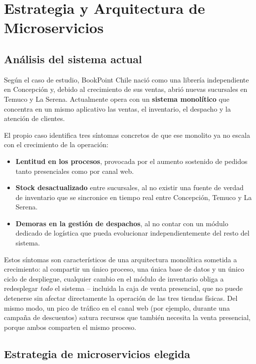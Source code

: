 \chapter{Estrategia y Arquitectura de Microservicios}
\label{ch:arquitectura}

\section{Análisis del sistema actual}

Según el caso de estudio, BookPoint Chile nació como una librería independiente en
Concepción y, debido al crecimiento de sus ventas, abrió nuevas sucursales en Temuco y
La Serena. Actualmente opera con un \textbf{sistema monolítico} que concentra en un
mismo aplicativo las ventas, el inventario, el despacho y la atención de clientes.

El propio caso identifica tres síntomas concretos de que ese monolito ya no escala con
el crecimiento de la operación:

\begin{itemize}
    \item \textbf{Lentitud en los procesos}, provocada por el aumento sostenido de
    pedidos tanto presenciales como por canal web.
    \item \textbf{Stock desactualizado} entre sucursales, al no existir una fuente de
    verdad de inventario que se sincronice en tiempo real entre Concepción, Temuco y
    La Serena.
    \item \textbf{Demoras en la gestión de despachos}, al no contar con un módulo
    dedicado de logística que pueda evolucionar independientemente del resto del
    sistema.
\end{itemize}

Estos síntomas son característicos de una arquitectura monolítica sometida a
crecimiento: al compartir un único proceso, una única base de datos y un único ciclo de
despliegue, cualquier cambio en el módulo de inventario obliga a redesplegar
\textit{todo} el sistema -- incluida la caja de venta presencial, que no puede
detenerse sin afectar directamente la operación de las tres tiendas físicas. Del mismo
modo, un pico de tráfico en el canal web (por ejemplo, durante una campaña de
descuentos) satura recursos que también necesita la venta presencial, porque ambos
comparten el mismo proceso.

\section{Estrategia de microservicios elegida}


